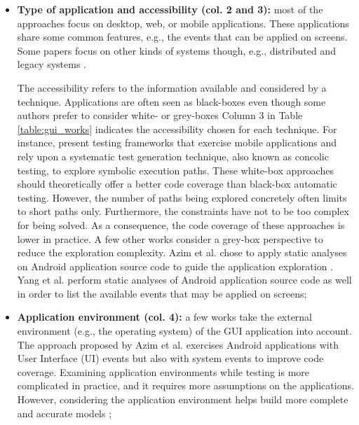 \begin{itemize}
	\item \textbf{Type of application and accessibility (col.
	2 and 3):} most of the approaches focus on desktop, web, or
	mobile applications. These applications share some common
	features, e.g., the events that can be applied on screens.
	Some papers focus on other kinds of systems though, e.g.,
	distributed and legacy systems \cite{hungar2002}.

	The accessibility refers to the information available and
	considered by a technique. Applications are often seen as
	black-boxes even though some authors prefer to consider
	white- or grey-boxes Column 3 in Table
	\ref{table:gui_works} indicates the accessibility chosen
	for each technique. For instance,
	\cite{concolicandroid12,5416728} present testing frameworks
	that exercise mobile applications and rely upon a
	systematic test generation technique, also known as concolic
	testing, to explore symbolic execution paths. These white-box
	approaches should theoretically offer a better code coverage
	than black-box automatic testing. However, the number of
	paths being explored concretely often limits to short paths
	only. Furthermore, the constraints have not to be too
	complex for being solved. As a consequence, the code coverage
	of these approaches is lower in practice.
	A few other works consider a grey-box perspective to reduce
	the exploration complexity. Azim et al. chose to apply static
	analyses on Android application source code to guide the
	application exploration \cite{Azim13}. Yang et al.
	\cite{WPX13} perform static analyses of Android application
	source code as well in order to list the available events
	that may be applied on screens;

	\item \textbf{Application environment (col. 4):} a few works
	\cite{Azim13,SP15} take the external environment (e.g., the
	operating system) of the GUI application into account.
	The approach proposed by Azim et al. \cite{Azim13} exercises
	Android applications with User Interface (UI) events but also
	with system events to improve code coverage. Examining
	application environments while testing is more complicated in
	practice, and it requires more assumptions on the
	applications. However, considering the application environment
	helps build more complete and accurate models \cite{SP15};



\end{itemize}
